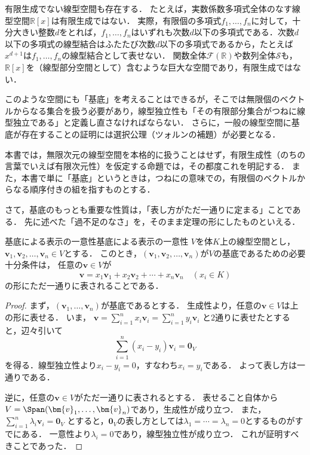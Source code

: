 \begin{mycolumn}
  有限生成でない線型空間も存在する．
  たとえば，実数係数多項式全体のなす線型空間$\mathbb{R}[x]$は有限生成ではない．
  実際，有限個の多項式$f_1, \dots, f_n$に対して，十分大きい整数$d$をとれば，$f_1, \dots, f_n$はいずれも次数$d$以下の多項式である．次数$d$以下の多項式の線型結合はふたたび次数$d$以下の多項式であるから，たとえば$x^{d+1}$は$f_1, \dots, f_n$の線型結合として表せない．
  関数全体$\mathcal{F}(\mathbb{R})$や数列全体$\mathcal{S}$も，$\mathbb{R}[x]$を（線型部分空間として）含むような巨大な空間であり，有限生成ではない．

  このような空間にも「基底」を考えることはできるが，そこでは無限個のベクトルからなる集合を扱う必要があり，線型独立性も「その有限部分集合がつねに線型独立である」と定義し直さなければならない．
  さらに，一般の線型空間に基底が存在することの証明には選択公理（ツォルンの補題）が必要となる．

  本書では，無限次元の線型空間を本格的に扱うことはせず，有限生成性（のちの言葉でいえば有限次元性）を仮定する命題では，その都度これを明記する．
  また，本書で単に「基底」というときは，つねにの意味での，有限個のベクトルからなる順序付きの組を指すものとする．
\end{mycolumn}

さて，基底のもっとも重要な性質は，「表し方がただ一通りに定まる」ことである．
先に述べた「過不足のなさ」を，そのまま定理の形にしたものといえる．

\begin{theorem}{基底による表示の一意性}{基底による表示の一意性}
  $V$を体$K$上の線型空間とし，$\bm{v}_1, \bm{v}_2, \dots, \bm{v}_n \in V$とする．
  このとき，$(\bm{v}_1, \bm{v}_2, \dots, \bm{v}_n)$が$V$の基底であるための必要十分条件は，
  任意の$\bm{v} \in V$が
  \[
    \bm{v} = x_1 \bm{v}_1 + x_2 \bm{v}_2 + \cdots + x_n \bm{v}_n
    \quad (x_i \in K)
  \]
  の形にただ一通りに表されることである．
\end{theorem}

\begin{tleftbar}
\begin{proof}
  まず，$(\bm{v}_1, \dots, \bm{v}_n)$が基底であるとする．
  生成性より，任意の$\bm{v} \in V$は上の形に表せる．
  いま，
  $\bm{v} = \sum_{i=1}^{n} x_i \bm{v}_i = \sum_{i=1}^{n} y_i \bm{v}_i$
  と$2$通りに表せたとすると，辺々引いて
  \[
    \sum_{i=1}^{n} (x_i - y_i) \bm{v}_i = \bm{0}_V
  \]
  を得る．線型独立性より$x_i - y_i = 0$，すなわち$x_i = y_i$である．
  よって表し方は一通りである．

  逆に，任意の$\bm{v} \in V$がただ一通りに表されるとする．
  表せること自体から$V = \Span(\bm{v}_1, \dots, \bm{v}_n)$であり，生成性が成り立つ．
  また，
  $\sum_{i=1}^{n} \lambda_i \bm{v}_i = \bm{0}_V$
  とすると，$\bm{0}_V$の表し方としては$\lambda_1 = \cdots = \lambda_n = 0$とするものがすでにある．
  一意性より$\lambda_i = 0$であり，線型独立性が成り立つ．
  これが証明すべきことであった．
\end{proof}
\end{tleftbar}

